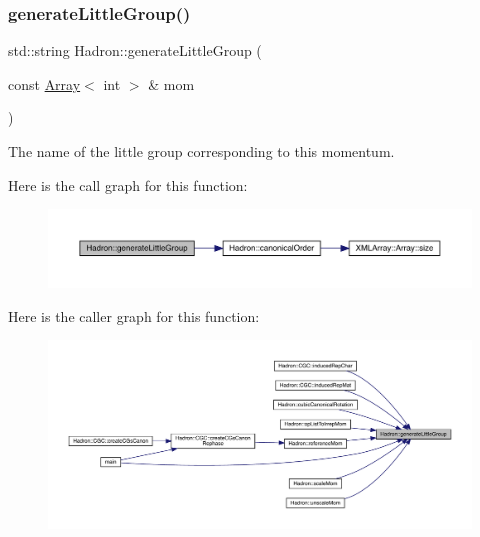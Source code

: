 \subsubsection{\texorpdfstring{generateLittleGroup()}{generateLittleGroup()}}
{\footnotesize\ttfamily std\+::string Hadron\+::generate\+Little\+Group (\begin{DoxyParamCaption}\item[{const \mbox{\hyperlink{classXMLArray_1_1Array}{Array}}$<$ int $>$ \&}]{mom }\end{DoxyParamCaption})}



The name of the little group corresponding to this momentum. 

Here is the call graph for this function\+:\nopagebreak
\begin{figure}[H]
\begin{center}
\leavevmode
\includegraphics[width=350pt]{d1/daf/namespaceHadron_a511bab858a88c02ec88a697fd5430e0d_cgraph}
\end{center}
\end{figure}
Here is the caller graph for this function\+:\nopagebreak
\begin{figure}[H]
\begin{center}
\leavevmode
\includegraphics[width=350pt]{d1/daf/namespaceHadron_a511bab858a88c02ec88a697fd5430e0d_icgraph}
\end{center}
\end{figure}
\mbox{\label{namespaceHadron_a12d4f9d40cac2700ebb7a7420f20987b}} 
